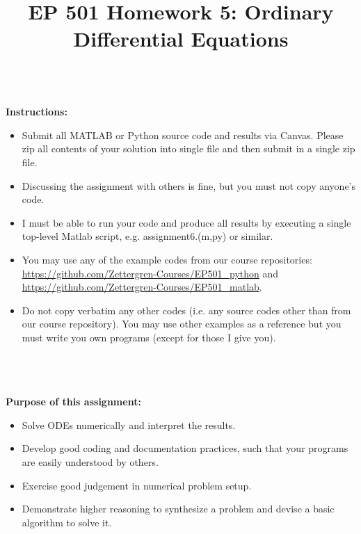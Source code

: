 \documentclass{article}
\begin{document}
\title{EP 501 Homework 5:  Ordinary Differential Equations}

\maketitle

~\\
\textbf{Instructions:}  
\begin{itemize}
  \item Submit all MATLAB or Python source code and results via Canvas.  Please zip all contents of your solution into single file and then submit in a single zip file.    
  \item Discussing the assignment with others is fine, but you must not copy anyone's code.  
  \item I must be able to run your code and produce all results by executing a single top-level Matlab script, e.g. \textsf{assignment6.(m,py)} or similar.  
  \item You may use any of the example codes from our course repositories:  \url{https://github.com/Zettergren-Courses/EP501_python} and \url{https://github.com/Zettergren-Courses/EP501_matlab}.
  \item Do not copy verbatim any other codes (i.e. any source codes other than from our course repository).  You may use other examples as a reference but you must write you own programs (except for those I give you).  

\end{itemize}
~\\~\\~\\
\textbf{Purpose of this assignment:}  
\begin{itemize}
  \item Solve ODEs numerically and interpret the results.  
  \item Develop good coding and documentation practices, such that your programs are easily understood by others.  
  \item Exercise good judgement in numerical problem setup.
  \item Demonstrate higher reasoning to synthesize a problem and devise a basic algorithm to solve it.  
\end{itemize}

\pagebreak
\end{document}
